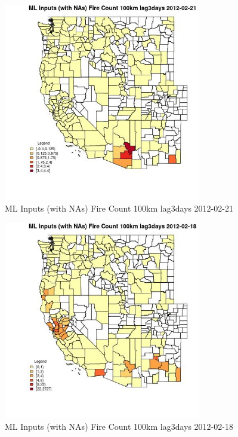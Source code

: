 \begin{figure} 
\centering  
\includegraphics[width=0.77\textwidth]{Code_Outputs/Report_ML_input_PM25_Step4_part_f_de_duplicated_aveswNAs_CountyFire_Count_100km_lag3daysMean2012-02-21.jpg} 
\caption{\label{fig:Report_ML_input_PM25_Step4_part_f_de_duplicated_aveswNAsCountyFire_Count_100km_lag3daysMean2012-02-21}ML Inputs (with NAs) Fire Count 100km lag3days 2012-02-21} 
\end{figure} 
 

\begin{figure} 
\centering  
\includegraphics[width=0.77\textwidth]{Code_Outputs/Report_ML_input_PM25_Step4_part_f_de_duplicated_aveswNAs_CountyFire_Count_100km_lag3daysMean2012-02-18.jpg} 
\caption{\label{fig:Report_ML_input_PM25_Step4_part_f_de_duplicated_aveswNAsCountyFire_Count_100km_lag3daysMean2012-02-18}ML Inputs (with NAs) Fire Count 100km lag3days 2012-02-18} 
\end{figure} 
 

